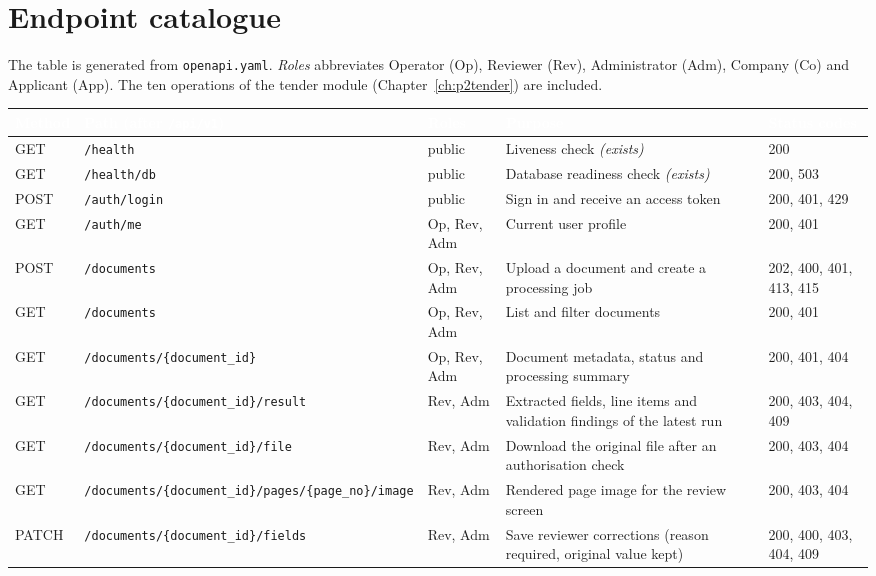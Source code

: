 \documentclass[11pt,a4paper]{report}
\newcommand{\hdr}[1]{\textcolor{white}{\sffamily\bfseries #1}}
\newcommand{\tblstart}{\rowcolors{2}{white}{rowgray}\arrayrulecolor{teal!60}}
\newcommand{\hdrrow}{\rowcolor{navy}}
\begin{document}
\section{Endpoint catalogue}
The table is generated from \texttt{openapi.yaml}. \emph{Roles} abbreviates Operator (Op), Reviewer (Rev), Administrator (Adm), Company (Co) and Applicant (App). The ten operations of the tender module (Chapter~\ref{ch:p2tender}) are included.
{\tblstart\footnotesize
\begin{longtable}{L{1.3cm}L{5.0cm}L{1.6cm}L{4.4cm}L{1.9cm}}
\hdrrow \hdr{Method} & \hdr{Path (after \texttt{/api/v1})} & \hdr{Roles} & \hdr{Purpose} & \hdr{Status codes}\\ \endhead
GET & \texttt{/\allowbreak health} & public & Liveness check \emph{(exists)} & 200\\
GET & \texttt{/\allowbreak health/\allowbreak db} & public & Database readiness check \emph{(exists)} & 200, 503\\
POST & \texttt{/\allowbreak auth/\allowbreak login} & public & Sign in and receive an access token & 200, 401, 429\\
GET & \texttt{/\allowbreak auth/\allowbreak me} & Op, Rev, Adm & Current user profile & 200, 401\\
POST & \texttt{/\allowbreak documents} & Op, Rev, Adm & Upload a document and create a processing job & 202, 400, 401, 413, 415\\
GET & \texttt{/\allowbreak documents} & Op, Rev, Adm & List and filter documents & 200, 401\\
GET & \texttt{/\allowbreak documents/\allowbreak \{document\_id\}} & Op, Rev, Adm & Document metadata, status and processing summary & 200, 401, 404\\
GET & \texttt{/\allowbreak documents/\allowbreak \{document\_id\}/\allowbreak result} & Rev, Adm & Extracted fields, line items and validation findings of the latest run & 200, 403, 404, 409\\
GET & \texttt{/\allowbreak documents/\allowbreak \{document\_id\}/\allowbreak file} & Rev, Adm & Download the original file after an authorisation check & 200, 403, 404\\
GET & \texttt{/\allowbreak documents/\allowbreak \{document\_id\}/\allowbreak pages/\allowbreak \{page\_no\}/\allowbreak image} & Rev, Adm & Rendered page image for the review screen & 200, 403, 404\\
PATCH & \texttt{/\allowbreak documents/\allowbreak \{document\_id\}/\allowbreak fields} & Rev, Adm & Save reviewer corrections (reason required, original value kept) & 200, 400, 403, 404, 409\\

\end{longtable}}
\end{document}
